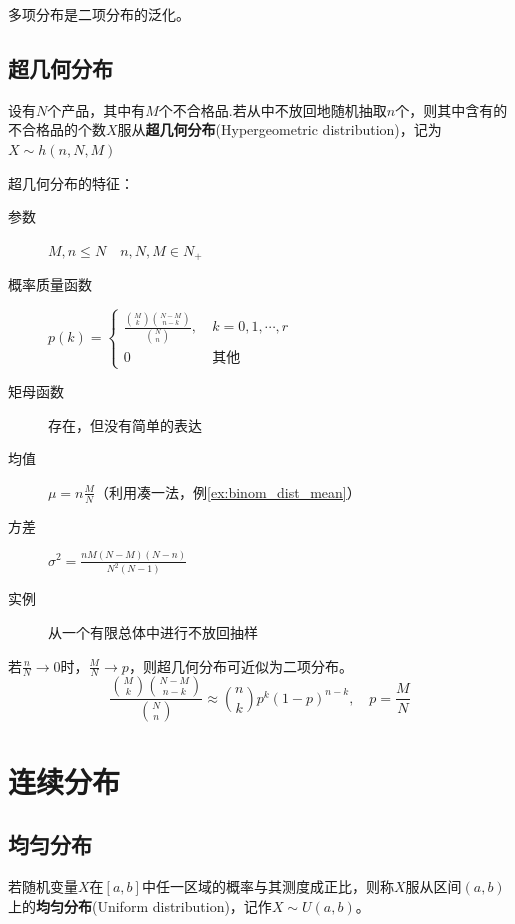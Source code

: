 \begin{remark}
    多项分布是二项分布的泛化。
\end{remark}

\subsection{超几何分布}

\begin{definition}
    设有$N$个产品，其中有$M$个不合格品.若从中不放回地随机抽取$n$个，则其中含有的不合格品的个数$X$服从\textbf{超几何分布}(Hypergeometric distribution)，记为$X \sim h(n,N,M)$
\end{definition}

超几何分布的特征：
\begin{description}
    \item[参数] $M,n \le N \quad n,N,M \in N_+$
    \item[概率质量函数] $p(k)=\begin{cases}
                \frac{\binom Mk \binom{N-M}{n-k}} {\binom Nn}  ,\  & k = 0,1,\cdots,r \\
                0                                                  & \text{其他}
            \end{cases}$
    \item[矩母函数] 存在，但没有简单的表达
    \item[均值] $\mu=n\frac{M}{N}$（利用凑一法，例\ref{ex:binom_dist_mean}）
    \item[方差] $\sigma^2=\frac{nM(N-M)(N-n)}{N^2(N-1)}$
    \item[实例] 从一个有限总体中进行不放回抽样
\end{description}

\begin{remark}
    若$\frac{n}{N} \to 0$时，$\frac{M}{N} \to p$，则超几何分布可近似为二项分布。
    \[ \frac{\binom {M}{k} \binom{N-M}{n-k}} {\binom {N}{n}} \approx \binom{n}{k}p^k(1-p)^{n-k} ,\quad p=\frac{M}{N} \]
\end{remark}

\section{连续分布}

\subsection{均匀分布}

\begin{definition}
    若随机变量$X$在$[a,b]$中任一区域的概率与其测度成正比，则称$X$服从区间$(a,b)$上的\textbf{均匀分布}(Uniform distribution)，记作$X \sim U(a,b)$。
\end{definition}

